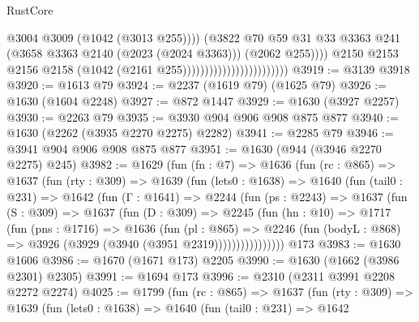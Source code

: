 \begin{lexlean}{RustCore}
\begin{coremodule}
                                                        @3004
                                                        @3009
                                                        (@1042 (@3013 @255))))
                                                    (@3822
                                                      @70
                                                      @59
                                                      @31
                                                      @33
                                                      @3363
                                                      @241
                                                      (@3658 @3363 @2140 (@2023 (@2024 @3363)))
                                                      (@2062 @255))))
                                                @2150
                                                @2153
                                                @2156
                                                @2158
                                                (@1042 (@2161 @255))))))))))))))))))))))))
@3919 := @3139 @3918
@3920 := @1613 @79
@3924 := @2237 (@1619 @79) (@1625 @79)
@3926 := @1630 (@1604 @2248)
@3927 := @872 @1447
@3929 := @1630 (@3927 @2257)
@3930 := @2263 @79
@3935 := @3930 @904 @906 @908 @875 @877
@3940 := @1630 (@2262 (@3935 @2270 @2275) @2282)
@3941 := @2285 @79
@3946 := @3941 @904 @906 @908 @875 @877
@3951 := @1630 (@944 (@3946 @2270 @2275) @245)
@3982 := @1629
    (fun (fn : @7) =>
    @1636
      (fun (rc : @865) =>
      @1637
        (fun (rty : @309) =>
        @1639
          (fun (lets0 : @1638) =>
          @1640
            (fun (tail0 : @231) =>
            @1642
              (fun (Γ : @1641) =>
              @2244
                (fun (ps : @2243) =>
                @1637
                  (fun (S : @309) =>
                  @1637
                    (fun (D : @309) =>
                    @2245
                      (fun (hn : @10) =>
                      @1717
                        (fun (pns : @1716) =>
                        @1636
                          (fun (pl : @865) =>
                          @2246
                            (fun (bodyL : @868) => @3926 (@3929 (@3940 (@3951 @2319))))))))))))))))
    @173
@3983 := @1630 @1606
@3986 := @1670 (@1671 @173) @2205
@3990 := @1630 (@1662 (@3986 @2301) @2305)
@3991 := @1694 @173
@3996 := @2310 (@2311 @3991 @2208 @2272 @2274)
@4025 := @1799
    (fun (rc : @865) =>
    @1637
      (fun (rty : @309) =>
      @1639
        (fun (lets0 : @1638) =>
        @1640
          (fun (tail0 : @231) =>
          @1642

\end{coremodule}
\end{lexlean}

